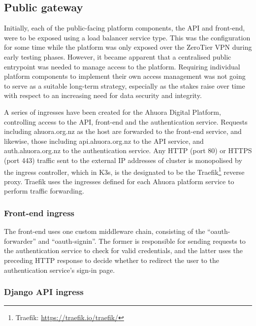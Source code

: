 \subsection{Public gateway}

Initially, each of the public-facing platform components, the API and front-end, were to be exposed using a load balancer service type. This was the configuration for some time while the platform was only exposed over the ZeroTier VPN during early testing phases. However, it became apparent that a centralised public entrypoint was needed to manage access to the platform. Requiring individual platform components to implement their own access management was not going to serve as a suitable long-term strategy, especially as the stakes raise over time with respect to an increasing need for data security and integrity.

A series of ingresses have been created for the Ahuora Digital Platform, controlling access to the API, front-end and the authentication service. Requests including ahuora.org.nz as the host are forwarded to the front-end service, and likewise, those including api.ahuora.org.nz to the API service, and auth.ahuora.org.nz to the authentication service. Any HTTP (port 80) or HTTPS (port 443) traffic sent to the external IP addresses of cluster is monopolised by the ingress controller, which in K3s, is the designated to be the Traefik\footnote{Traefik: \url{https://traefik.io/traefik/}} reverse proxy. Traefik uses the ingresses defined for each Ahuora platform service to perform traffic forwarding.


\subsubsection{Front-end ingress}

The front-end uses one custom middleware chain, consisting of the ``oauth-forwarder'' and ``oauth-signin''. The former is responsible for sending requests to the authentication service to check for valid credentials, and the latter uses the preceding HTTP response to decide whether to redirect the user to the authentication service's sign-in page.

\subsubsection{Django API ingress}


